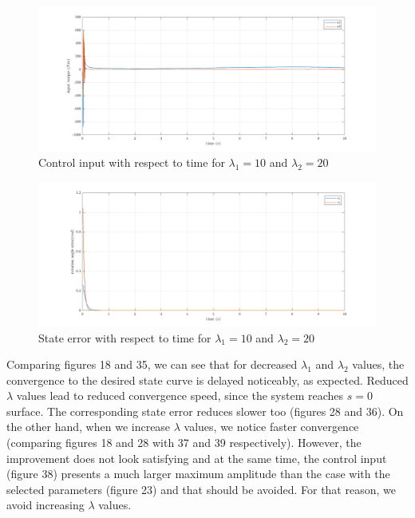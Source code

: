 \documentclass[a4paper]{article}
\begin{document}
\begin{figure}[H]
    \centering
    \includegraphics[width=15cm]{fig/sim2/lincrease/ulincrease.png}
    \caption{Control input with respect to time for $\lambda_1=10$ and $\lambda_2=20$}
\end{figure}
\begin{figure}[H]
    \centering
    \includegraphics[width=15cm]{fig/sim2/lincrease/elincrease.png}
    \caption{State error with respect to time for $\lambda_1=10$ and $\lambda_2=20$}
\end{figure}

\noindent\hspace{-2pt}
Comparing figures 18 and 35, we can see that for decreased $\lambda_1$ and $\lambda_2$ values, the convergence to the 
desired state curve is delayed noticeably, as expected. Reduced $\lambda$ values lead to reduced convergence speed, since 
the system reaches $s=0$ surface. The corresponding state error reduces slower too (figures 28 and 36). On the other hand, 
when we increase $\lambda$ values, we notice faster convergence (comparing figures 18 and 28 with 37 and 39 respectively). 
However, the improvement does not look satisfying and at the same time, the control input (figure 38) presents a much larger maximum 
amplitude than the case with the selected parameters (figure 23) and that should be avoided. For that reason, we avoid increasing 
$\lambda$ values.
\end{document}
